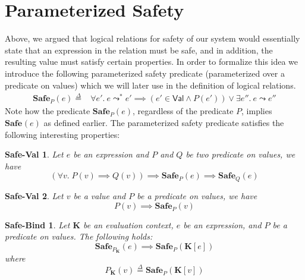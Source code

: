 \documentclass{article}
\newcommand{\VAL}{\mathsf{Val}}
\newcommand{\ectx}{\mathbf{K}}
\newcommand{\defeq}{\overset{\Delta}{=}}
\newcommand{\pred}{P}
\newcommand{\predB}{Q}
\newcommand{\expr}{e}
\newcommand{\val}{v}
\newcommand{\step}{\leadsto}
\newcommand{\steps}{\leadsto^*}
\newcommand{\Safe}[1]{\textbf{Safe}_{#1}}
\begin{document}
\section{Parameterized Safety}
\label{sec:safety}

Above, we argued that logical relations for safety of our system would essentially state that an expression in the relation must be safe, and in addition, the resulting value must satisfy certain properties.
In order to formalize this idea we introduce the following parameterized safety predicate (parameterized over a predicate on values) which we will later use in the definition of logical relations.
\begin{align*}
  \Safe{\pred}(\expr) \defeq{}& \forall \expr'.~ \expr \steps \expr' \implies (\expr' \in \VAL \land P(\expr')) \lor \exists \expr''.~\expr \step \expr''
\end{align*}
Note how the predicate $\Safe{\pred}(\expr)$, regardless of the predicate $\pred$, implies $\Safe{}(\expr)$ as defined earlier.
The parameterized safety predicate satisfies the following interesting properties:

\newtheorem*{safevallemma}{Safe-Val}
\newtheorem*{safebindlemma}{Safe-Bind}
\newtheorem*{safesteplemma}{Safe-Step}
\newtheorem*{safemonolemma}{Safe-Mono}

\begin{safevallemma}
  \makeatletter{}\makeatother
  \label{lem:safemono}
  Let $\expr$ be an expression and $\pred$ and $\predB$ be two predicate on values, we have
  \[(\forall \val.\; \pred(\val) \implies \predB(\val)) \implies \Safe{\pred}(\expr) \implies \Safe{\predB}(\expr)\]
\end{safevallemma}


\begin{safevallemma}
  \makeatletter{}\makeatother
  \label{lem:safeval}
  Let $\val$ be a value and $\pred$ be a predicate on values, we have
  \[\pred(\val) \implies \Safe{\pred}(\val)\]
\end{safevallemma}

\begin{safebindlemma}
  \makeatletter{}\makeatother
  \label{lem:safebind}
  Let $\ectx$ be an evaluation context, $\expr$ be an expression, and $\pred$ be a predicate on values.
  The following holds:
  \[\Safe{\pred_{\ectx}}(\expr) \implies \Safe{\pred}(\ectx[\expr])\]
  where
  \[\pred_{\ectx}(\val) \defeq{} \Safe{\pred}(\ectx[\val])\]
\end{safebindlemma}
\end{document}
